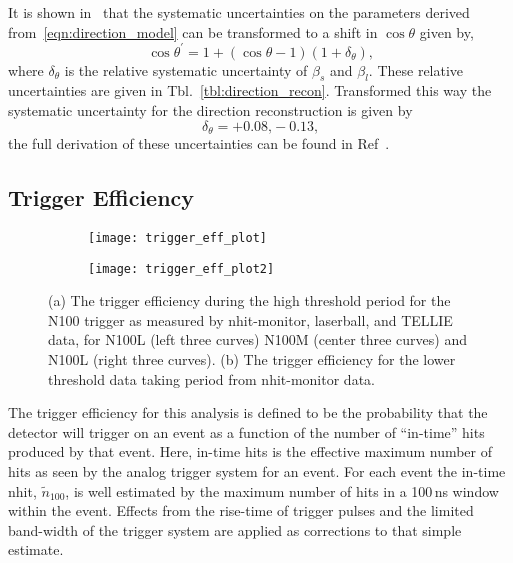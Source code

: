 It is shown in~\citep{pierre_luc_thesis} that the systematic uncertainties on the
parameters derived from~\eqref{eqn:direction_model} can be transformed to a shift
in $\cos\theta$ given by,
\begin{equation}
    \cos\theta^{\prime} = 1+(\cos\theta-1)(1+\delta_{\theta})\text{,}
\end{equation}
where $\delta_{\theta}$ is the relative systematic uncertainty of $\beta_{s}$ and $\beta_{l}$.
These relative uncertainties are given in Tbl.~\ref{tbl:direction_recon}.
Transformed this way the systematic uncertainty for the direction reconstruction
is given by
\begin{equation*}
    \delta_{\theta} = +0.08\text{,} -0.13\text{,}
\end{equation*}
the full derivation of these uncertainties can be found in Ref~\citep{snop_water_unidoc}.

\subsection{Trigger Efficiency}
\label{sec:trigeff}
\begin{figure}[htbp]
    \centering
    \begin{subfigure}{0.78\textwidth}
        \centering
    \texttt{[image: trigger\_eff\_plot]}
    \caption{}
    \end{subfigure}
    \begin{subfigure}{0.78\textwidth}
        \centering
    \texttt{[image: trigger\_eff\_plot2]}
    \end{subfigure}
    \caption[Trigger Efficiecy, Before And After Threshold Changes]{
        (a) The trigger efficiency during the high threshold period for the
        N100 trigger as measured by nhit-monitor, laserball, and TELLIE data,
        for N100L (left three curves) N100M (center three curves) and N100L
        (right three curves). (b) The trigger efficiency for the lower threshold
        data taking period from nhit-monitor data.}
    \label{fig:trigeff_plots}
\end{figure}

The trigger efficiency for this analysis is defined to be the probability that
the detector will trigger on an event as a function of the number of ``in-time''
hits produced by that event.
Here, in-time hits is the effective maximum number of hits as seen by the analog
trigger system for an event.
For each event the in-time nhit, $\tilde{n}_{100}$, is well
estimated by the maximum number of hits in a 100\,ns window within the event.
Effects from the rise-time of trigger pulses and the limited band-width of the
trigger system are applied as corrections to that simple estimate.

